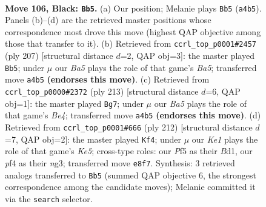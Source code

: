 \documentclass[11pt]{article}
\begin{document}
\clearpage

\begin{figure}[p]\centering
\begin{subfigure}{0.46\textwidth}\centering
\resizebox{\linewidth}{!}{%
\newchessgame
\chessboard[
  setfen={4k2K/8/8/5p2/b4P2/8/8/8 b - - 27 106},
  showmover=false,
  pgfstyle=straightmove, color=movearrow, markmove={a4-b5}
]}
\caption{}
\end{subfigure}\hfill
\begin{subfigure}{0.46\textwidth}\centering
\resizebox{\linewidth}{!}{%
\newchessgame
\chessboard[
  setfen={4k3/8/p7/P7/b7/8/3K3B/8 b - - 15 104},
  showmover=false,
  pgfstyle=straightmove, color=movearrow, markmove={a4-b5}
]}
\caption{}
\end{subfigure}
\\[4pt]
\begin{subfigure}{0.46\textwidth}\centering
\resizebox{\linewidth}{!}{%
\newchessgame
\chessboard[
  setfen={8/8/k7/4b3/2K5/p7/P7/6N1 b - - 71 107},
  showmover=false,
  pgfstyle=straightmove, color=movearrow, markmove={e5-g7}
]}
\caption{}
\end{subfigure}\hfill
\begin{subfigure}{0.46\textwidth}\centering
\resizebox{\linewidth}{!}{%
\newchessgame
\chessboard[
  setfen={7B/4k3/8/4K3/8/6n1/8/3B4 w - - 11 107},
  showmover=false,
  pgfstyle=straightmove, color=movearrow, markmove={e5-f4}
]}
\caption{}
\end{subfigure}
\caption{\textbf{Move 106, Black: \texttt{Bb5}.} (a) Our position; Melanie plays \texttt{Bb5} (\texttt{a4b5}). Panels (b)--(d) are the retrieved master positions whose correspondence most drove this move (highest QAP objective among those that transfer to it). (b) Retrieved from \texttt{ccrl\_top\_p0001\#2457} (ply 207) [structural distance $d$=2, QAP obj=3]: the master played \texttt{Bb5}; under $\mu$ our \emph{Ba5} plays the role of that game's \emph{Ba5}; transferred move \texttt{a4b5} \textbf{(endorses this move)}. (c) Retrieved from \texttt{ccrl\_top\_p0000\#2372} (ply 213) [structural distance $d$=6, QAP obj=1]: the master played \texttt{Bg7}; under $\mu$ our \emph{Ba5} plays the role of that game's \emph{Be4}; transferred move \texttt{a4b5} \textbf{(endorses this move)}. (d) Retrieved from \texttt{ccrl\_top\_p0001\#666} (ply 212) [structural distance $d$=7, QAP obj=2]: the master played \texttt{Kf4}; under $\mu$ our \emph{Ke1} plays the role of that game's \emph{Ke5}; cross-type roles: our \emph{P}f5 as their \emph{B}d1, our \emph{p}f4 as their \emph{n}g3; transferred move \texttt{e8f7}. Synthesis: 3 retrieved analogs transferred to \texttt{Bb5} (summed QAP objective 6, the strongest correspondence among the candidate moves); Melanie committed it via the \texttt{search} selector.}
\label{fig:thought-m211}
\end{figure}
\end{document}
